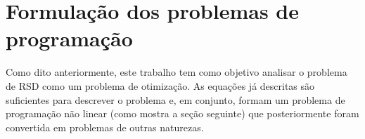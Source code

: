 \section{Formulação dos problemas de programação}

Como dito anteriormente, este trabalho tem como objetivo analisar o problema de RSD como um problema de otimização.
As equações já descritas são suficientes para descrever o problema e, em conjunto, formam um problema de programação não linear (como mostra a seção seguinte) que posteriormente foram convertida em problemas de outras naturezas.